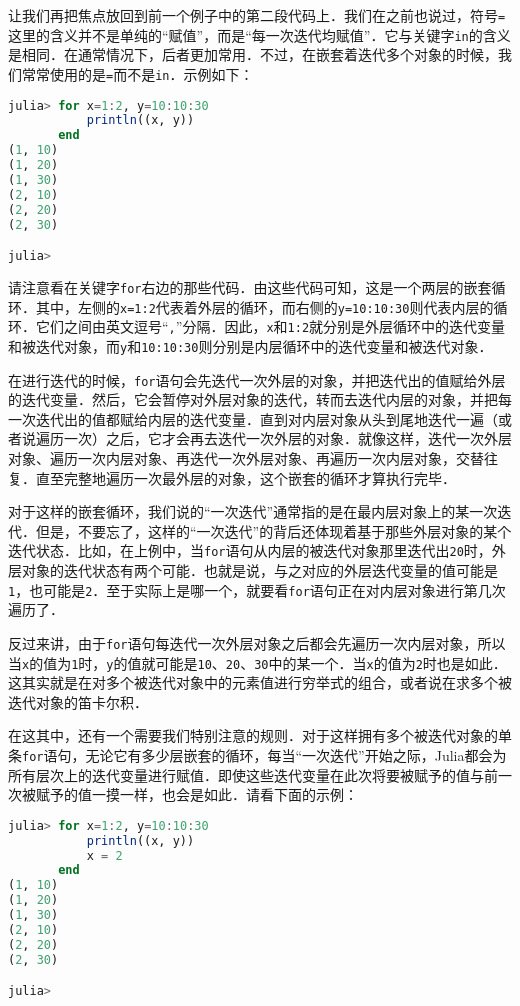 让我们再把焦点放回到前一个例子中的第二段代码上．我们在之前也说过，符号\verb|=|这里的含义并不是单纯的“赋值”，而是“每一次迭代均赋值”．它与关键字\verb|in|的含义是相同．在通常情况下，后者更加常用．不过，在嵌套着迭代多个对象的时候，我们常常使用的是\verb|=|而不是\verb|in|．示例如下：
\begin{lstlisting}[language=julia]
julia> for x=1:2, y=10:10:30
           println((x, y))
       end
(1, 10)
(1, 20)
(1, 30)
(2, 10)
(2, 20)
(2, 30)

julia>
\end{lstlisting}

请注意看在关键字\verb|for|右边的那些代码．由这些代码可知，这是一个两层的嵌套循环．其中，左侧的\verb|x=1:2|代表着外层的循环，而右侧的\verb|y=10:10:30|则代表内层的循环．它们之间由英文逗号“\verb|,|”分隔．因此，\verb|x|和\verb|1:2|就分别是外层循环中的迭代变量和被迭代对象，而\verb|y|和\verb|10:10:30|则分别是内层循环中的迭代变量和被迭代对象．

在进行迭代的时候，\verb|for|语句会先迭代一次外层的对象，并把迭代出的值赋给外层的迭代变量．然后，它会暂停对外层对象的迭代，转而去迭代内层的对象，并把每一次迭代出的值都赋给内层的迭代变量．直到对内层对象从头到尾地迭代一遍（或者说遍历一次）之后，它才会再去迭代一次外层的对象．就像这样，迭代一次外层对象、遍历一次内层对象、再迭代一次外层对象、再遍历一次内层对象，交替往复．直至完整地遍历一次最外层的对象，这个嵌套的循环才算执行完毕．

对于这样的嵌套循环，我们说的“一次迭代”通常指的是在最内层对象上的某一次迭代．但是，不要忘了，这样的“一次迭代”的背后还体现着基于那些外层对象的某个迭代状态．比如，在上例中，当\verb|for|语句从内层的被迭代对象那里迭代出\verb|20|时，外层对象的迭代状态有两个可能．也就是说，与之对应的外层迭代变量的值可能是\verb|1|，也可能是\verb|2|．至于实际上是哪一个，就要看\verb|for|语句正在对内层对象进行第几次遍历了．

反过来讲，由于\verb|for|语句每迭代一次外层对象之后都会先遍历一次内层对象，所以当\verb|x|的值为\verb|1|时，\verb|y|的值就可能是\verb|10|、\verb|20|、\verb|30|中的某一个．当\verb|x|的值为\verb|2|时也是如此．这其实就是在对多个被迭代对象中的元素值进行穷举式的组合，或者说在求多个被迭代对象的笛卡尔积．

在这其中，还有一个需要我们特别注意的规则．对于这样拥有多个被迭代对象的单条\verb|for|语句，无论它有多少层嵌套的循环，每当“一次迭代”开始之际，Julia都会为所有层次上的迭代变量进行赋值．即使这些迭代变量在此次将要被赋予的值与前一次被赋予的值一摸一样，也会是如此．请看下面的示例：
\begin{lstlisting}[language=julia]
julia> for x=1:2, y=10:10:30
           println((x, y))
           x = 2
       end
(1, 10)
(1, 20)
(1, 30)
(2, 10)
(2, 20)
(2, 30)

julia> 
\end{lstlisting}


